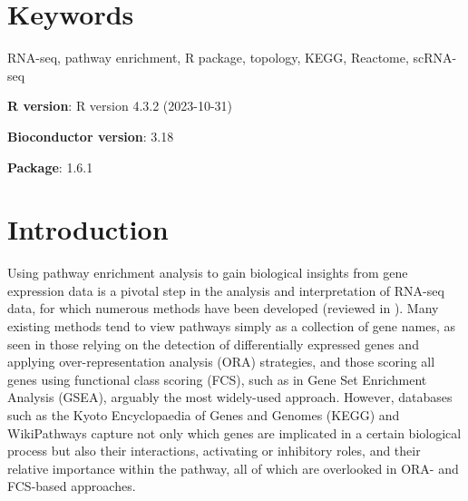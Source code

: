 \documentclass[9pt,a4paper,]{extarticle}
\begin{document}
\section*{Keywords}
RNA-seq, pathway enrichment, R package, topology, KEGG, Reactome, scRNA-seq


\clearpage
\pagestyle{main}

\textbf{R version}: R version 4.3.2 (2023-10-31)

\textbf{Bioconductor version}: 3.18

\textbf{Package}: 1.6.1

\hypertarget{introduction}{%
\section{Introduction}\label{introduction}}

Using pathway enrichment analysis to gain biological insights from gene expression data is a pivotal step in the analysis and interpretation of RNA-seq data, for which numerous methods have been developed (reviewed in \citep{Maleki2020-ur, Mubeen2022-eq}).
Many existing methods tend to view pathways simply as a collection of gene names, as seen in those relying on the detection of differentially expressed genes and applying over-representation analysis (ORA) strategies, and those scoring all genes using functional class scoring (FCS), such as in Gene Set Enrichment Analysis (GSEA)\citep{Subramanian2005-lx}, arguably the most widely-used approach.
However, databases such as the Kyoto Encyclopaedia of Genes and Genomes (KEGG)\citep{OgataKEGGKyotoEncyclopediaa} and WikiPathways\citep{Martens2021} capture not only which genes are implicated in a certain biological process but also their interactions, activating or inhibitory roles, and their relative importance within the pathway, all of which are overlooked in ORA- and FCS-based approaches.
\end{document}
